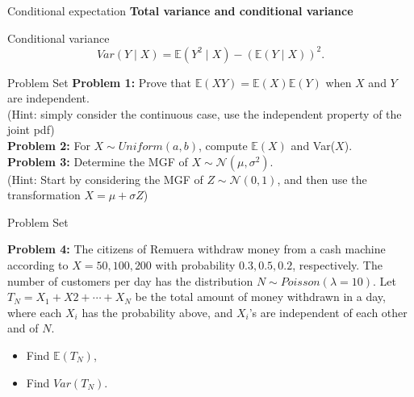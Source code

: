 \documentclass [aspectratio=169]{beamer}
\newcommand{\mc}{\mathcal}
\begin{document}
\begin{frame}{Conditional expectation}
    \textbf{Total variance and conditional variance}
    \begin{block}{Conditional variance}
      $$
      Var(Y \mid X) = \mathbb{E}(Y^2 \mid X) - \left(\mathbb{E}(Y \mid X)\right)^2.
      $$
    \end{block}
\end{frame}

\begin{frame}{Problem Set}
    \textbf{Problem 1:}  Prove that $\mathbb{E}(XY) = \mathbb{E}(X)\mathbb{E}(Y)$ when $X$ and $Y$ are independent. \\
    (Hint: simply consider the continuous case, use the independent property of the joint pdf)\\
    \vspace{0.1in}
     \textbf{Problem 2:} For $X \sim Uniform(a, b)$, compute $\mathbb{E}(X)$ and Var($X$).
    \vspace{0.1in}\\
    \textbf{Problem 3:} Determine the MGF of $X \sim \mc{N}(\mu, \sigma^2)$. \\(Hint: Start by considering the MGF of $Z \sim \mc{N}(0,1)$, and then use the transformation $X = \mu + \sigma Z$)
\end{frame}


\begin{frame}{Problem Set}

\textbf{Problem 4:} 
The citizens of Remuera withdraw money from a cash machine according to $X = 50, 100, 200$ with probability $0.3, 0.5, 0.2$, respectively. The number of customers per day has the distribution $N \sim Poisson(\lambda = 10)$.
Let $T_N = X_1 + X2 + \cdots + X_N$ be the total amount of money withdrawn in a day, where each $X_i$ has the probability above, and $X_i$'s are independent of each other and of $N$.\\
\begin{itemize}
    \item Find $\mathbb{E}(T_N)$,
    \item Find $Var(T_N)$.
\end{itemize}
\end{frame}
\end{document}
